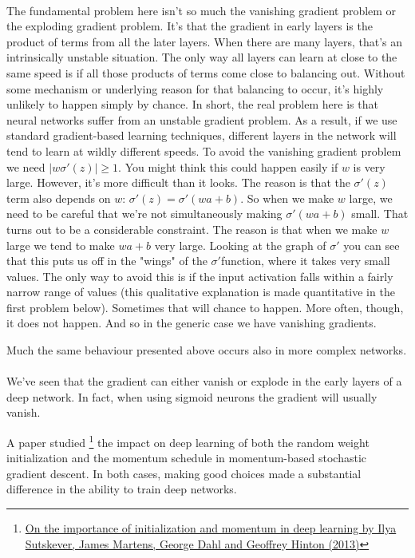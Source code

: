 \paragraph{} The fundamental problem here isn't so much the vanishing gradient problem or the exploding gradient problem. It's that the gradient in early layers is the product of terms from all the later layers. When there are many layers, that's an intrinsically unstable situation. The only way all layers can learn at close to the same speed is if all those products of terms come close to balancing out. Without some mechanism or underlying reason for that balancing to occur, it's highly unlikely to happen simply by chance. In short, the real problem here is that neural networks suffer from an unstable gradient problem. As a result, if we use standard gradient-based learning techniques, different layers in the network will tend to learn at wildly different speeds. To avoid the vanishing gradient problem we need $|w\sigma'(z)|\ge 1$. You might think this could happen easily if $w$ is very large. However, it's more difficult than it looks. The reason is that the $\sigma'(z)$ term also depends on $w$: $\sigma'(z)=\sigma'(wa+b)$. So when we make $w$ large, we need to be careful that we're not simultaneously making $\sigma'(wa+b)$ small. That turns out to be a considerable constraint. The reason is that when we make $w$ large we tend to make $wa+b$ very large. Looking at the graph of $\sigma'$ you can see that this puts us off in the "wings" of the $\sigma'$function, where it takes very small values. The only way to avoid this is if the input activation falls within a fairly narrow range of values (this qualitative explanation is made quantitative in the first problem below). Sometimes that will chance to happen. More often, though, it does not happen. And so in the generic case we have vanishing gradients.

Much the same behaviour presented above occurs also in more complex networks. 

\paragraph{} We've seen that the gradient can either vanish or explode in the early layers of a deep network. In fact, when using sigmoid neurons the gradient will usually vanish. 

A paper studied \footnote{\href{http://www.cs.toronto.edu/~hinton/absps/momentum.pdf}{On the importance of initialization and momentum in deep learning by Ilya Sutskever, James Martens, George Dahl and Geoffrey Hinton (2013)}} the impact on deep learning of both the random weight initialization and the momentum schedule in momentum-based stochastic gradient descent. In both cases, making good choices made a substantial difference in the ability to train deep networks.

